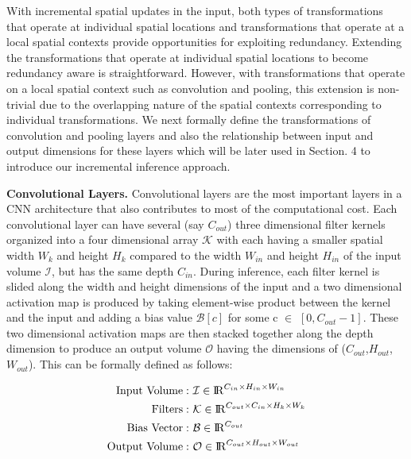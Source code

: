 With incremental spatial updates in the input, both types of transformations that operate at individual spatial locations and transformations that operate at a local spatial contexts provide opportunities for exploiting redundancy. Extending the transformations that operate at individual spatial locations to become redundancy aware is straightforward. However, with transformations that operate on a local spatial context such as convolution and pooling, this extension is non-trivial due to the overlapping nature of the spatial contexts corresponding to individual transformations. We next formally define the transformations of convolution and pooling layers and also the relationship between input and output dimensions for these layers which will be later used in Section. 4 to introduce our incremental inference approach.

\vspace{2mm}
\noindent \textbf{Convolutional Layers.} Convolutional layers are the most important layers in a CNN architecture that also contributes to most of the computational cost. Each convolutional layer can have several (say $C_{out}$) three dimensional filter kernels organized into a four dimensional array $\mathcal{K}$ with each having a smaller spatial width $W_k$ and height $H_k$ compared to the width $W_{in}$ and height $H_{in}$ of the input volume $\mathcal{I}$, but has the same depth $C_{in}$. During inference, each filter kernel is slided along the width and height dimensions of the input and a two dimensional activation map is produced by taking element-wise product between the kernel and the input and adding a bias value $\mathcal{B}[c]$ for some c $\in$ $[0, C_{out}-1]$. These two dimensional activation maps are then stacked together along the depth dimension to produce an output volume $\mathcal{O}$ having the dimensions of ($C_{out}$,$H_{out}$,$W_{out}$). This can be formally defined as follows:

\vspace{-2mm}
\begin{align}
\text{Input Volume}:&~ \mathcal{I} \in \mathcal{\rm I\!R}^{C_{in} \times H_{in} \times W_{in}}\\
\text{Filters}:&~ \mathcal{K} \in \mathcal{\rm I\!R}^{C_{out} \times C_{in} \times H_{k} \times W_{k}}\\
\text{Bias Vector}:&~ \mathcal{B} \in \mathcal{\rm I\!R}^{C_{out}}\\
\text{Output Volume}:&~ \mathcal{O} \in \mathcal{\rm I\!R}^{C_{out} \times H_{out} \times W_{out}}
\end{align}

